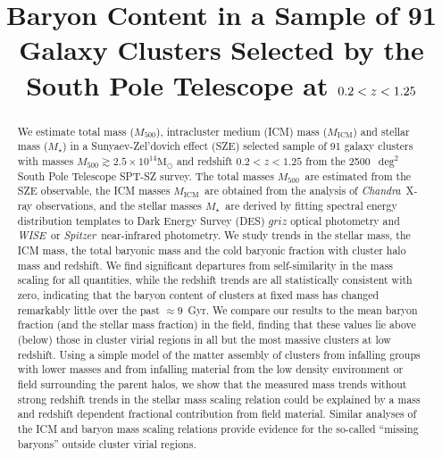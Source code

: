\documentclass[useAMS,usenatbib,iop,numberedappendix]{mn2e}
\title[Baryon Content of Galaxy Clusters]{
Baryon Content in a Sample of 91
Galaxy Clusters Selected by the South Pole Telescope at $0.2 < \redshift < 1.25$
}
\newcommand{\Msun}{\ensuremath{\mathrm{M}_{\odot}}}
\newcommand{\Mfiveoo}{\ensuremath{M_{500}}}
\newcommand{\redshift}{\ensuremath{z}}
\newcommand{\CHANDRA}{\emph{Chandra}}
\newcommand{\Spitzer}{\emph{Spitzer}}
\newcommand{\WISE}{\emph{WISE}}
\newcommand{\Mstar}{\ensuremath{M_{\star}}}
\newcommand{\Mgas}{\ensuremath{M_{\mathrm{ICM}}}}
\begin{document}
\pdfpageheight 11.7in
\pdfpagewidth 8.3in

%
%

\maketitle 

%
%

\begin{abstract}

We estimate total mass (\Mfiveoo), intracluster medium (ICM) mass (\Mgas) and stellar mass (\Mstar) in a Sunyaev-Zel'dovich effect (SZE) selected sample of 91 galaxy clusters with masses $\Mfiveoo\gtrsim2.5\times10^{14}\Msun$ and redshift $0.2 < \redshift < 1.25$ from the 2500~$\deg^2$ South Pole Telescope SPT-SZ survey.  The total masses \Mfiveoo\ are estimated from the SZE observable, the ICM masses \Mgas\ are obtained from the analysis of \CHANDRA\ X-ray observations, and the stellar masses \Mstar\ are derived by fitting spectral energy distribution templates to Dark Energy Survey (DES) $griz$ optical photometry and \WISE\ or \Spitzer\ near-infrared photometry.  We study trends in the stellar mass, the ICM mass, the total baryonic mass and the cold baryonic fraction with cluster halo mass and redshift.  We find significant departures from self-similarity in the mass scaling for all quantities, while the redshift trends are all statistically consistent with zero, indicating that the baryon content of clusters at fixed mass has changed remarkably little over the past $\approx9$~Gyr. We compare our results to the mean baryon fraction (and the stellar mass fraction) in the field, finding that these values lie above (below) those in cluster virial regions in all but the most massive clusters at low redshift.  Using a simple model of the matter assembly of clusters from infalling groups with lower masses and from infalling material from the low density environment or field surrounding the parent halos, we show that the 
measured mass trends without strong redshift trends
in the stellar mass scaling relation could be explained by
a mass and redshift dependent fractional contribution from field material.  Similar analyses of the ICM and baryon mass scaling relations provide evidence for the so-called ``missing baryons'' outside cluster virial regions.

\end{abstract}
\end{document}
